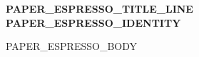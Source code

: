 \documentclass[10pt,PAPER_ESPRESSO_PAPER_SIZE,twocolumn]{article}
\begin{document}
{\fontsize{9.5}{10.5}\selectfont\bfseries PAPER_ESPRESSO_TITLE_LINE%
\hfill{\normalfont PAPER_ESPRESSO_IDENTITY}\par}
\vspace{1pt}

PAPER_ESPRESSO_BODY
\end{document}
